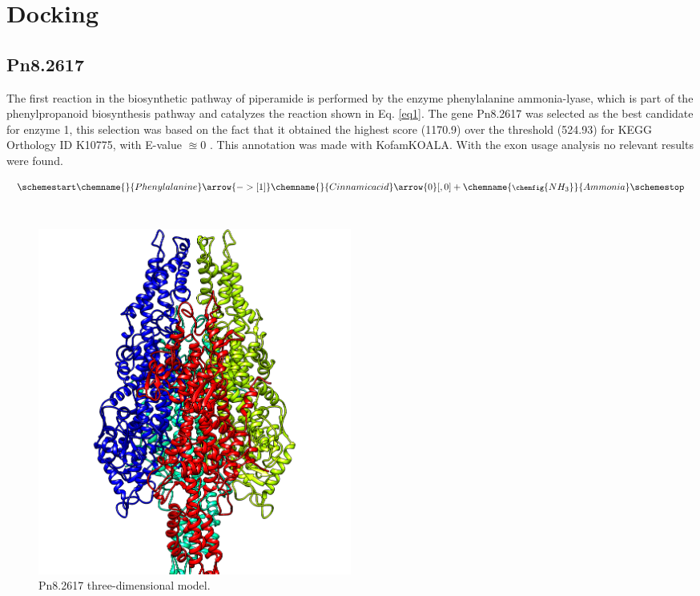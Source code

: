 \documentclass[12pt]{article}
\begin{document}
	
	\section{Docking}
	
	\subsection{Pn8.2617}
	
	The first reaction in the biosynthetic pathway of piperamide is performed by the enzyme phenylalanine ammonia-lyase, which is part of the phenylpropanoid biosynthesis pathway and catalyzes the reaction shown in Eq. \ref{eq1}. The gene Pn8.2617 was selected as the best candidate for enzyme 1, this selection was based on the fact that it obtained the highest score (1170.9) over the threshold (524.93) for KEGG Orthology ID K10775, with E-value $\approxeq 0$ . This annotation was made with KofamKOALA. \cite{kofamkoala} With the exon usage analysis no relevant results were found.
	
	
	\begin{equation}
		\schemestart
		 \label{eq1}
		\chemname{\footnotesize}{Phenylalanine}\arrow{->[ 1]}\chemname{\footnotesize}{Cinnamic acid}
		\arrow{0}[,0]+
		\chemname{\footnotesize\chemfig{NH_3}}{Ammonia}
		\schemestop
	\end{equation}\\
	
	\FloatBarrier
	\begin{figure}
		\centering
		\includegraphics[width=0.5\textwidth]{../1/Minimize/model.png}
		\caption{Pn8.2617 three-dimensional model.}
		\label{fig1_1}
	\end{figure}
	\FloatBarrier
	
\end{document}
